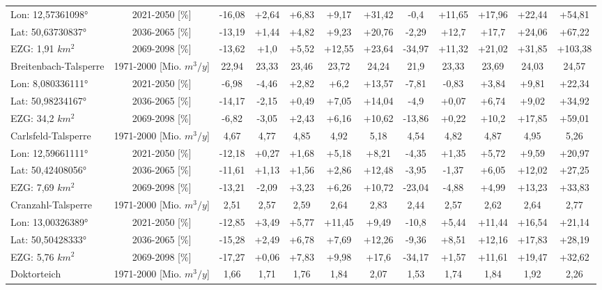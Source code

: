 \begin{longtable}{@{\extracolsep{\fill}}lc|ccccc||ccccc}
\cline{2-12} 
Lon: 12,57361098° & 2021-2050 [\%]  & -16,08 & +2,64 & +6,83 & +9,17 & +31,42 & -0,4 & +11,65 & +17,96 & +22,44 & +54,81\\ 
Lat: 50,63730837° & 2036-2065 [\%]  & -13,19 & +1,44 & +4,82 & +9,23 & +20,76 & -2,29 & +12,7 & +17,7 & +24,06 & +67,22\\ 
EZG: 1,91 $km^2$ & 2069-2098 [\%]  & -13,62 & +1,0 & +5,52 & +12,55 & +23,64 & -34,97 & +11,32 & +21,02 & +31,85 & +103,38\\ 
\hline 
Breitenbach-Talsperre & 1971-2000 [Mio. $m^3/y$]  & 22,94 & 23,33 & 23,46 & 23,72 & 24,24 & 21,9 & 23,33 & 23,69 & 24,03 & 24,57\\ 
\cline{2-12} 
Lon: 8,080336111° & 2021-2050 [\%]  & -6,98 & -4,46 & +2,82 & +6,2 & +13,57 & -7,81 & -0,83 & +3,84 & +9,81 & +22,34\\ 
Lat: 50,98234167° & 2036-2065 [\%]  & -14,17 & -2,15 & +0,49 & +7,05 & +14,04 & -4,9 & +0,07 & +6,74 & +9,02 & +34,92\\ 
EZG: 34,2 $km^2$ & 2069-2098 [\%]  & -6,82 & -3,05 & +2,43 & +6,16 & +10,62 & -13,86 & +0,22 & +10,2 & +17,85 & +59,01\\ 
\hline 
Carlsfeld-Talsperre & 1971-2000 [Mio. $m^3/y$]  & 4,67 & 4,77 & 4,85 & 4,92 & 5,18 & 4,54 & 4,82 & 4,87 & 4,95 & 5,26\\ 
\cline{2-12} 
Lon: 12,59661111° & 2021-2050 [\%]  & -12,18 & +0,27 & +1,68 & +5,18 & +8,21 & -4,35 & +1,35 & +5,72 & +9,59 & +20,97\\ 
Lat: 50,42408056° & 2036-2065 [\%]  & -11,61 & +1,13 & +1,56 & +2,86 & +12,48 & -3,95 & -1,37 & +6,05 & +12,02 & +27,25\\ 
EZG: 7,69 $km^2$ & 2069-2098 [\%]  & -13,21 & -2,09 & +3,23 & +6,26 & +10,72 & -23,04 & -4,88 & +4,99 & +13,23 & +33,83\\ 
\hline 
Cranzahl-Talsperre & 1971-2000 [Mio. $m^3/y$]  & 2,51 & 2,57 & 2,59 & 2,64 & 2,83 & 2,44 & 2,57 & 2,62 & 2,64 & 2,77\\ 
\cline{2-12} 
Lon: 13,00326389° & 2021-2050 [\%]  & -12,85 & +3,49 & +5,77 & +11,45 & +9,49 & -10,8 & +5,44 & +11,44 & +16,54 & +21,14\\ 
Lat: 50,50428333° & 2036-2065 [\%]  & -15,28 & +2,49 & +6,78 & +7,69 & +12,26 & -9,36 & +8,51 & +12,16 & +17,83 & +28,19\\ 
EZG: 5,76 $km^2$ & 2069-2098 [\%]  & -17,27 & +0,06 & +7,83 & +9,98 & +17,6 & -34,17 & +1,57 & +11,61 & +19,47 & +32,62\\ 
\hline 
Doktorteich & 1971-2000 [Mio. $m^3/y$]  & 1,66 & 1,71 & 1,76 & 1,84 & 2,07 & 1,53 & 1,74 & 1,84 & 1,92 & 2,26\\ 

\end{longtable}
